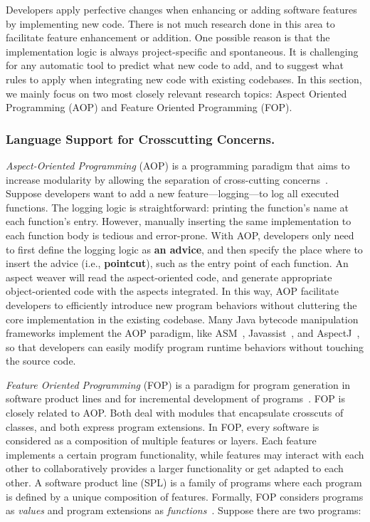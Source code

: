 \documentclass[runningheads,a4paper]{llncs}
\begin{document}
Developers apply perfective changes when enhancing or adding software features by implementing new code. There is not much research done in this area to facilitate feature enhancement or addition. One possible reason is that the implementation logic is always project-specific and spontaneous. It is challenging for any automatic tool to predict what new code to add, and to suggest what rules to apply when integrating new code with existing codebases. In this section, we mainly focus on two most closely relevant research topics: Aspect Oriented Programming (AOP) and Feature Oriented Programming (FOP).

\subsubsection{Language Support for Crosscutting Concerns.}
{\it Aspect-Oriented Programming} (AOP) is a programming paradigm that aims to increase modularity by allowing the separation of cross-cutting concerns~\cite{aspectj}. Suppose developers want to add a new feature---logging---to log all executed functions. 
The logging logic is straightforward: printing the function's name at each function's entry. However, manually inserting the same implementation to each function body is tedious and error-prone. With AOP, developers only need to first define the logging logic as \textbf{an advice}, and then specify the place where to insert the advice (i.e., \textbf{pointcut}), such as the entry point of each function. An aspect weaver will read the aspect-oriented code, and generate appropriate object-oriented code with the aspects integrated. In this way, AOP facilitate developers to efficiently introduce new program behaviors without cluttering the core implementation in the existing codebase. Many Java bytecode manipulation frameworks implement the AOP paradigm, like ASM~\cite{asm}, Javassist~\cite{javassist}, and AspectJ~\cite{aspectj}, so that developers can easily modify program runtime behaviors without touching the source code. 

{\it Feature Oriented Programming} (FOP) is a paradigm for program generation in software product lines and for incremental development of programs~\cite{Batory1992:DIH}. 
FOP is closely related to AOP. Both deal with modules that encapsulate crosscuts of classes, and both express program extensions.
In FOP, every software is considered as a composition of multiple features or layers. Each feature implements a certain program functionality, while features may interact with each other to collaboratively provides a larger functionality or get adapted to each other.
A software product line (SPL) is a family of programs where each program is defined by a unique composition of features. Formally, FOP considers programs as \emph{values} and program extensions as \emph{functions}~\cite{Lammel2013:fop}. Suppose there are two programs: 
\end{document}
